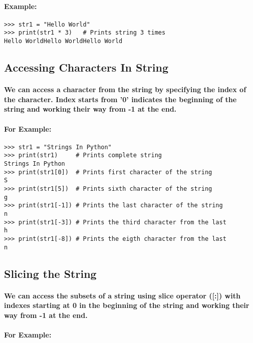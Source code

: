 \documentclass{book}
\begin{document}
\paragraph{Example:}

\begin{verbatim}
>>> str1 = "Hello World"
>>> print(str1 * 3)   # Prints string 3 times
Hello WorldHello WorldHello World
\end{verbatim}

\subsection*{Accessing Characters In String}

\paragraph{We can access a character from the string by specifying the index of the character. Index starts from
’0’ indicates the beginning of the string and working their way from -1 at the end.}

\paragraph{For Example:}

\begin{verbatim}
>>> str1 = "Strings In Python"
>>> print(str1)     # Prints complete string
Strings In Python
>>> print(str1[0])  # Prints first character of the string
S
>>> print(str1[5])  # Prints sixth character of the string
g
>>> print(str1[-1]) # Prints the last character of the string
n
>>> print(str1[-3]) # Prints the third character from the last
h
>>> print(str1[-8]) # Prints the eigth character from the last
n
\end{verbatim}

\subsection*{Slicing the String}

\paragraph{We can access the subsets of a string using slice operator ([:]) with indexes starting at 0 in the
beginning of the string and working their way from -1 at the end.}

\paragraph{For Example:}
\end{document}
